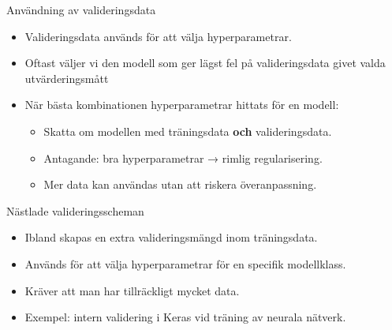 \documentclass[10pt,english]{beamer}
\begin{document}
\begin{frame}{Användning av valideringsdata}
\begin{itemize}
    \item Valideringsdata används för att välja hyperparametrar.
    \item Oftast väljer vi den modell som ger lägst fel på valideringsdata givet valda utvärderingsmått
    \item När bästa kombinationen hyperparametrar hittats för en modell:
    \begin{itemize}
        \item Skatta om modellen med träningsdata \textbf{och} valideringsdata.
        \item Antagande: bra hyperparametrar → rimlig regularisering.
        \item Mer data kan användas utan att riskera överanpassning.
    \end{itemize}
\end{itemize}
\end{frame}



\begin{frame}{Nästlade valideringsscheman}
\begin{itemize}
    \item Ibland skapas en extra valideringsmängd inom träningsdata.
    \item Används för att välja hyperparametrar för en specifik modellklass.
    \item Kräver att man har tillräckligt mycket data.
    \item Exempel: intern validering i Keras vid träning av neurala nätverk.
\end{itemize}
\end{frame}
\end{document}
